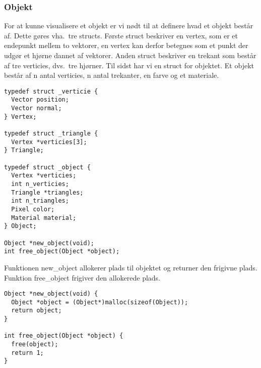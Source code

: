 \subsubsection{Objekt}
For at kunne visualisere et objekt er vi nødt til at definere hvad et objekt består af. Dette gøres vha.\ tre structs. Første struct beskriver en vertex, som er et endepunkt mellem to vektorer, en vertex kan derfor betegnes som et punkt der udgør et hjørne dannet af vektorer. Anden struct beskriver en trekant som består af tre verticies, dvs.\ tre hjørner. Til sidst har vi en struct for objektet. Et objekt består af n antal verticies, n antal trekanter, en farve og et materiale. 

\begin{lstlisting}[style=Cstyle, caption=Objekter]
typedef struct _verticie {
  Vector position;
  Vector normal;
} Vertex;

typedef struct _triangle {
  Vertex *verticies[3];
} Triangle;

typedef struct _object {
  Vertex *verticies;
  int n_verticies;
  Triangle *triangles;
  int n_triangles;
  Pixel color;
  Material material;
} Object;

Object *new_object(void);
int free_object(Object *object);
\end{lstlisting}

Funktionen new\_object allokerer plads til objektet og returner den frigivne plads. Funktion free\_object frigiver den allokerede plads. 
\begin{lstlisting}[style=Cstyle, caption=Funktionerne]
Object *new_object(void) {
  Object *object = (Object*)malloc(sizeof(Object));
  return object;
}

int free_object(Object *object) {
  free(object);
  return 1;
}
\end{lstlisting}



